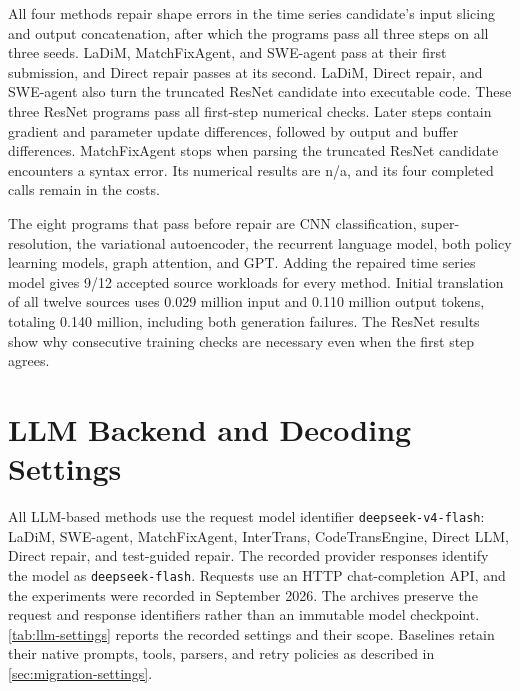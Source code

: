 All four methods repair shape errors in the time series candidate's input slicing and output concatenation, after which the programs pass all three steps on all three seeds. LaDiM, MatchFixAgent, and SWE-agent pass at their first submission, and Direct repair passes at its second. LaDiM, Direct repair, and SWE-agent also turn the truncated ResNet candidate into executable code. These three ResNet programs pass all first-step numerical checks. Later steps contain gradient and parameter update differences, followed by output and buffer differences. MatchFixAgent stops when parsing the truncated ResNet candidate encounters a syntax error. Its numerical results are n/a, and its four completed calls remain in the costs.

The eight programs that pass before repair are CNN classification, super-resolution, the variational autoencoder, the recurrent language model, both policy learning models, graph attention, and GPT. Adding the repaired time series model gives 9/12 accepted source workloads for every method. Initial translation of all twelve sources uses 0.029 million input and 0.110 million output tokens, totaling 0.140 million, including both generation failures. The ResNet results show why consecutive training checks are necessary even when the first step agrees.

\section{LLM Backend and Decoding Settings}
\label{sec:llm-settings}
All LLM-based methods use the request model identifier \texttt{deepseek-v4-flash}: LaDiM, SWE-agent, MatchFixAgent, InterTrans, CodeTransEngine, Direct LLM, Direct repair, and test-guided repair. The recorded provider responses identify the model as \texttt{deepseek-flash}. Requests use an HTTP chat-completion API, and the experiments were recorded in September 2026. The archives preserve the request and response identifiers rather than an immutable model checkpoint. \cref{tab:llm-settings} reports the recorded settings and their scope. Baselines retain their native prompts, tools, parsers, and retry policies as described in \cref{sec:migration-settings}.

